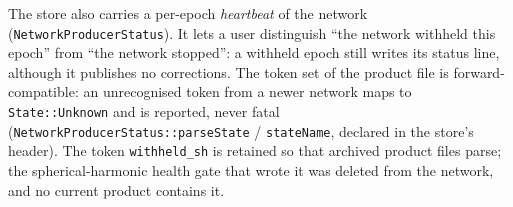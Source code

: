 \documentclass[main.tex]{subfiles}
\begin{document}
The store also carries a per-epoch \emph{heartbeat} of the network
(\texttt{NetworkProducerStatus}). It lets a user distinguish ``the
network withheld this epoch'' from ``the network stopped'': a withheld
epoch still writes its status line, although it publishes no corrections.
The token set of the product file is forward-compatible: an unrecognised
token from a newer network maps to \texttt{State::Unknown} and is reported,
never fatal (\texttt{NetworkProducerStatus::parseState} / \texttt{stateName},
declared in the store's header). The token \texttt{withheld\_sh} is retained
so that archived product files parse; the spherical-harmonic health gate that
wrote it was deleted from the network, and no current product contains it.

\ifSubfilesClassLoaded{\printbibliography}{}
\end{document}
